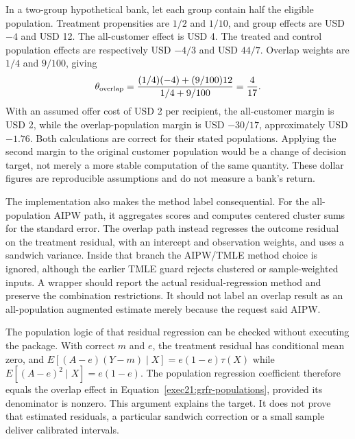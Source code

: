 In a two-group hypothetical bank, let each group contain half the eligible population. Treatment propensities are $1/2$ and $1/10$, and group effects are USD $-4$ and USD 12. The all-customer effect is USD 4. The treated and control population effects are respectively USD $-4/3$ and USD $44/7$. Overlap weights are $1/4$ and $9/100$, giving
\begin{equation}
 \theta_{\rm overlap}
 =\frac{(1/4)(-4)+(9/100)12}{1/4+9/100}
 =\frac{4}{17}.
 \label{exec21:grfr-overlap}
\end{equation}
With an assumed offer cost of USD 2 per recipient, the all-customer margin is USD 2, while the overlap-population margin is USD $-30/17$, approximately USD $-1.76$. Both calculations are correct for their stated populations. Applying the second margin to the original customer population would be a change of decision target, not merely a more stable computation of the same quantity. These dollar figures are reproducible assumptions and do not measure a bank's return.~\citep{exec21_grf_reference}

The implementation also makes the method label consequential. For the all-population AIPW path, it aggregates scores and computes centered cluster sums for the standard error. The overlap path instead regresses the outcome residual on the treatment residual, with an intercept and observation weights, and uses a sandwich variance. Inside that branch the AIPW/TMLE method choice is ignored, although the earlier TMLE guard rejects clustered or sample-weighted inputs. A wrapper should report the actual residual-regression method and preserve the combination restrictions. It should not label an overlap result as an all-population augmented estimate merely because the request said AIPW.~\citep{exec21_grf_reuse}

The population logic of that residual regression can be checked without executing the package. With correct $m$ and $e$, the treatment residual has conditional mean zero, and
$E[(A-e)(Y-m)\mid X]=e(1-e)\tau(X)$ while
$E[(A-e)^2\mid X]=e(1-e)$. The population regression coefficient therefore equals the overlap effect in Equation~\eqref{exec21:grfr-populations}, provided its denominator is nonzero. This argument explains the target. It does not prove that estimated residuals, a particular sandwich correction or a small sample deliver calibrated intervals.

